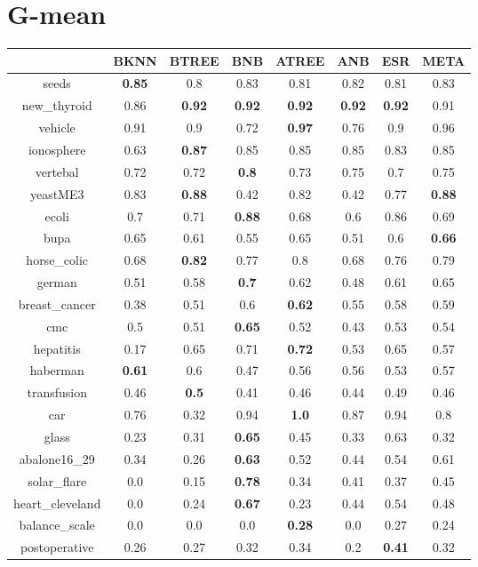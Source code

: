\documentclass{article}%
\begin{document}
\section*{G{-}mean}%
\begin{tabular}{c|ccccccc}%
\hline%
&BKNN&BTREE&BNB&ATREE&ANB&ESR&META\\%
\hline%
seeds&\textbf{0.85}&0.8&0.83&0.81&0.82&0.81&0.83\\%
new\_thyroid&0.86&\textbf{0.92}&\textbf{0.92}&\textbf{0.92}&\textbf{0.92}&\textbf{0.92}&0.91\\%
vehicle&0.91&0.9&0.72&\textbf{0.97}&0.76&0.9&0.96\\%
ionosphere&0.63&\textbf{0.87}&0.85&0.85&0.85&0.83&0.85\\%
vertebal&0.72&0.72&\textbf{0.8}&0.73&0.75&0.7&0.75\\%
yeastME3&0.83&\textbf{0.88}&0.42&0.82&0.42&0.77&\textbf{0.88}\\%
ecoli&0.7&0.71&\textbf{0.88}&0.68&0.6&0.86&0.69\\%
bupa&0.65&0.61&0.55&0.65&0.51&0.6&\textbf{0.66}\\%
horse\_colic&0.68&\textbf{0.82}&0.77&0.8&0.68&0.76&0.79\\%
german&0.51&0.58&\textbf{0.7}&0.62&0.48&0.61&0.65\\%
breast\_cancer&0.38&0.51&0.6&\textbf{0.62}&0.55&0.58&0.59\\%
cmc&0.5&0.51&\textbf{0.65}&0.52&0.43&0.53&0.54\\%
hepatitis&0.17&0.65&0.71&\textbf{0.72}&0.53&0.65&0.57\\%
haberman&\textbf{0.61}&0.6&0.47&0.56&0.56&0.53&0.57\\%
transfusion&0.46&\textbf{0.5}&0.41&0.46&0.44&0.49&0.46\\%
car&0.76&0.32&0.94&\textbf{1.0}&0.87&0.94&0.8\\%
glass&0.23&0.31&\textbf{0.65}&0.45&0.33&0.63&0.32\\%
abalone16\_29&0.34&0.26&\textbf{0.63}&0.52&0.44&0.54&0.61\\%
solar\_flare&0.0&0.15&\textbf{0.78}&0.34&0.41&0.37&0.45\\%
heart\_cleveland&0.0&0.24&\textbf{0.67}&0.23&0.44&0.54&0.48\\%
balance\_scale&0.0&0.0&0.0&\textbf{0.28}&0.0&0.27&0.24\\%
postoperative&0.26&0.27&0.32&0.34&0.2&\textbf{0.41}&0.32\\%
\end{tabular}

%
\end{document}
